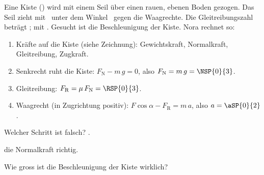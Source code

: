 Eine Kiste (\mKO) wird mit einem Seil über einen rauen, ebenen Boden gezogen. Das Seil zieht mit \FZO\ unter dem Winkel \alO\ gegen die Waagrechte. Die Gleitreibungszahl beträgt \muGO;  mit \gO. Gesucht ist die Beschleunigung der Kiste. Nora rechnet so:

\begin{center}
\end{center}

\begin{enumerate}
\item Kräfte auf die Kiste (siehe Zeichnung): Gewichtskraft, Normalkraft, Gleitreibung, Zugkraft.
\item Senkrecht ruht die Kiste: $F_\mathrm{N} - m\,g = 0$, also $F_\mathrm{N} = m\,g = \NSP{0}{3}$.
\item Gleitreibung: $F_\mathrm{R} = \mu\,F_\mathrm{N} = \RSP{0}{3}$.
\item Waagrecht (in Zugrichtung positiv): $F\cos\alpha - F_\mathrm{R} = m\,a$, also $a = \aSP{0}{2}$.
\end{enumerate}

\begin{abcliste}
\abc
Welcher Schritt ist falsch? .

\abc
{} die Normalkraft richtig.

\abc
Wie gross ist die Beschleunigung der Kiste wirklich?
\end{abcliste}
